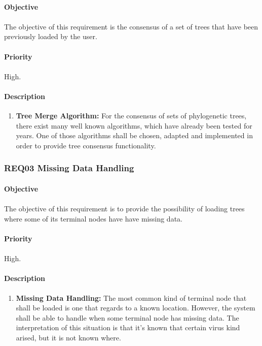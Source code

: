 \documentclass[10pt,a4paper]{article}
\begin{document}
\paragraph{Objective}
\paragraph{}
The objective of this requirement is the consensus of a set of trees that have been previously loaded by the user. 
\paragraph{Priority}
\paragraph{}
High.
\paragraph{Description}
  \begin{enumerate}
    \item \textbf{Tree Merge Algorithm:}
	For the consensus of sets of phylogenetic trees, there exist many well known algorithms, which have already been tested for years. One of those algorithms shall be chosen, adapted and implemented in order to provide tree consensus functionality.
    \end{enumerate}

  \subsubsection{REQ03 Missing Data Handling}
\paragraph{Objective}
\paragraph{}
The objective of this requirement is to provide the possibility of loading trees where some of its terminal nodes have have missing data.
\paragraph{Priority}
\paragraph{}
High.
\paragraph{Description}
  \begin{enumerate}
    \item \textbf{Missing Data Handling: }
	The most common kind of terminal node that shall be loaded is one that regards to a known location. However, the system shall be able to handle when some terminal node has missing data. The interpretation of this situation is that it's known that certain virus kind arised, but it is not known where.
    \end{enumerate}
	
\end{document}
